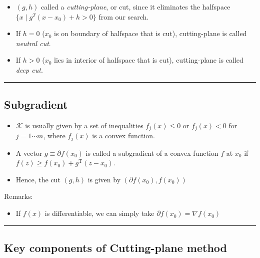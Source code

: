\documentclass[]{article}
\providecommand{\tightlist}{%
  \setlength{\itemsep}{0pt}\setlength{\parskip}{0pt}}
\begin{document}
\begin{itemize}
\item
  \((g,h)\) called a \emph{cutting-plane}, or cut, since it eliminates
  the halfspace \(\{x \mid g^T (x - x_0) + h > 0\}\) from our search.
\item
  If \(h=0\) (\(x_0\) is on boundary of halfspace that is cut),
  cutting-plane is called \emph{neutral cut}.
\item
  If \(h>0\) (\(x_0\) lies in interior of halfspace that is cut),
  cutting-plane is called \emph{deep cut}.
\end{itemize}

\begin{center}\rule{0.5\linewidth}{\linethickness}\end{center}

\hypertarget{subgradient}{%
\subsection{Subgradient}\label{subgradient}}

\begin{itemize}
\tightlist
\item
  \(\mathcal{K}\) is usually given by a set of inequalities
  \(f_j(x) \le 0\) or \(f_j(x) < 0\) for \(j = 1 \cdots m\), where
  \(f_j(x)\) is a convex function.
\item
  A vector \(g \equiv \partial f(x_0)\) is called a subgradient of a
  convex function \(f\) at \(x_0\) if
  \(f(z) \geq f(x_0) + g^\mathrm{T} (z - x_0)\).
\item
  Hence, the cut \((g, h)\) is given by \((\partial f(x_0), f(x_0))\)
\end{itemize}

Remarks:

\begin{itemize}
\tightlist
\item
  If \(f(x)\) is differentiable, we can simply take
  \(\partial f(x_0) = \nabla f(x_0)\)
\end{itemize}

\begin{center}\rule{0.5\linewidth}{\linethickness}\end{center}

\hypertarget{key-components-of-cutting-plane-method}{%
\subsection{Key components of Cutting-plane
method}\label{key-components-of-cutting-plane-method}}
\end{document}
